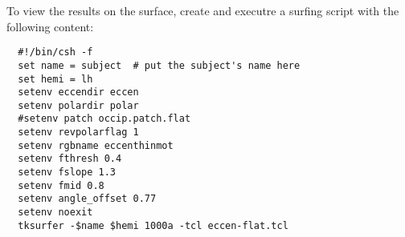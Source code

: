 \documentclass[10pt]{article}
\begin{document}
To view the results on the surface, create and executre a surfing script with the
following content:
\begin{verbatim}
  #!/bin/csh -f
  set name = subject  # put the subject's name here
  set hemi = lh
  setenv eccendir eccen
  setenv polardir polar
  #setenv patch occip.patch.flat
  setenv revpolarflag 1
  setenv rgbname eccenthinmot
  setenv fthresh 0.4
  setenv fslope 1.3
  setenv fmid 0.8
  setenv angle_offset 0.77
  setenv noexit
  tksurfer -$name $hemi 1000a -tcl eccen-flat.tcl
\end{verbatim}
\end{document}
